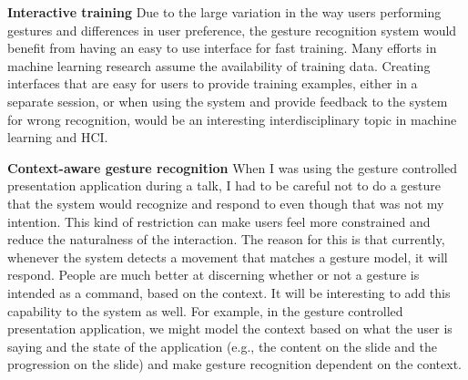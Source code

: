 \textbf{Interactive training} Due to the large variation in the way users
performing gestures and differences in user preference, the gesture recognition
system would benefit from having an easy to use interface for fast training.
Many efforts in machine learning research assume the availability of
training data. Creating interfaces that are easy for users to provide training examples, either in a
separate session, or when using the system and provide feedback to the system
for wrong recognition, would be an interesting interdisciplinary topic in
machine learning and HCI.

\textbf{Context-aware gesture recognition} When I was using the gesture
controlled presentation application during a talk, I had to be careful 
not to do a gesture that the system would recognize and respond to 
even though that was not my intention. This kind of restriction can make users
feel more constrained and reduce the naturalness of the interaction. The reason
for this is that currently, whenever the system detects a movement that matches a
gesture model, it will respond. People are much better at discerning whether or
not a gesture is intended as a command, based on the context. It will be
interesting to add this capability to the system as well. For example, in the
gesture controlled presentation application, we might model the context based on
what the user is saying and the state of the application (e.g., the content on
the slide and the progression on the slide) and make gesture recognition
dependent on the context.
